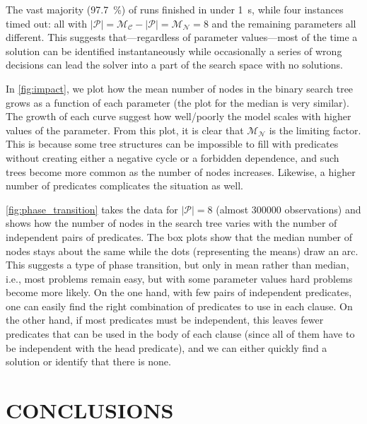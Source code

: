 \documentclass[letterpaper]{article}
\theoremstyle{definition}
\newcommand{\predicates}{\mathcal{P}}
\newcommand{\maxNumNodes}{\mathcal{M}_{\mathcal{N}}}
\newcommand{\maxNumClauses}{\mathcal{M}_{\mathcal{C}}}
\begin{document}
The vast majority (\SI{97.7}{\percent}) of runs finished in under
\SI{1}{\second}, while four instances timed out: all with $|\predicates| =
\maxNumClauses{} - |\predicates{}| = \maxNumNodes{} = 8$ and the remaining
parameters all different. This suggests that---regardless of parameter
values---most of the time a solution can be identified instantaneously while
occasionally a series of wrong decisions can lead the solver into a part of the
search space with no solutions.

In \cref{fig:impact}, we plot how the mean number of nodes in the binary search
tree grows as a function of each parameter (the plot for the median is very
similar). The growth of each curve suggest how well/poorly the model scales with
higher values of the parameter. From this plot, it is clear that
$\maxNumNodes{}$ is the limiting factor. This is because some tree structures
can be impossible to fill with predicates without creating either a negative
cycle or a forbidden dependence, and such trees become more common as the number
of nodes increases. Likewise, a higher number of predicates complicates the
situation as well.

\cref{fig:phase_transition} takes the data for $|\predicates{}| = 8$ (almost
\num{300000} observations) and shows how the number of nodes in the search tree
varies with the number of independent pairs of predicates. The box plots show
that the median number of nodes stays about the same while the dots
(representing the means) draw an arc. This suggests a type of phase transition,
but only in mean rather than median, i.e., most problems remain easy, but with
some parameter values hard problems become more likely. On the one hand, with
few pairs of independent predicates, one can easily find the right combination
of predicates to use in each clause. On the other hand, if most predicates must
be independent, this leaves fewer predicates that can be used in the body of
each clause (since all of them have to be independent with the head predicate),
and we can either quickly find a solution or identify that there is none.


\section{CONCLUSIONS}
\end{document}
